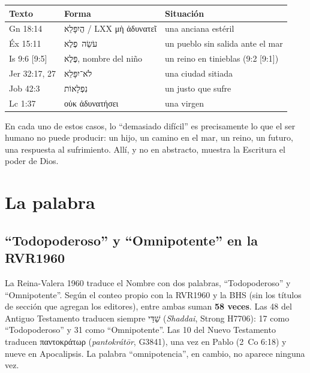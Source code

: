 \documentclass[11pt,letterpaper]{article}
\newcommand{\heb}[1]{\mbox{\foreignlanguage{hebrew}{#1}}}
\newcommand{\grc}[1]{\foreignlanguage{ancientgreek}{#1}}
\begin{document}
\begin{center}\small\renewcommand{\arraystretch}{1.25}
\begin{tabular}{@{}L{2.6cm}L{5.4cm}L{6.4cm}@{}}
\toprule
\textbf{Texto} & \textbf{Forma} & \textbf{Situación} \\ \midrule
Gn 18:14 & \heb{הֲיִפָּלֵא} / LXX \grc{μὴ ἀδυνατεῖ} & una anciana estéril \\
Éx 15:11 & \heb{עֹשֵׂה פֶלֶא} & un pueblo sin salida ante el mar \\
Is 9:6 [9:5] & \heb{פֶּלֶא}, nombre del niño & un reino en tinieblas (9:2 [9:1]) \\
Jer 32:17, 27 & \heb{לֹא־יִפָּלֵא} & una ciudad sitiada \\
Job 42:3 & \heb{נִפְלָאוֹת} & un justo que sufre \\
Lc 1:37 & \grc{οὐκ ἀδυνατήσει} & una virgen \\
\bottomrule
\end{tabular}\end{center}

En cada uno de estos casos, lo ``demasiado difícil'' es precisamente lo que el ser humano no puede producir: un hijo, un camino en el mar, un reino, un futuro, una respuesta al sufrimiento. Allí, y no en abstracto, muestra la Escritura el poder de Dios.

\section{La palabra}

\subsection{``Todopoderoso'' y ``Omnipotente'' en la RVR1960}\label{sec:shaddai}

La Reina-Valera 1960 traduce el Nombre con dos palabras, ``Todopoderoso'' y ``Omnipotente''. Según el conteo propio con la RVR1960 y la BHS (sin los títulos de sección que agregan los editores), entre ambas suman \textbf{58 veces}. Las 48 del Antiguo Testamento traducen siempre \heb{שַׁדַּי} (\emph{Shaddai}, Strong H7706): 17 como ``Todopoderoso'' y 31 como ``Omnipotente''. Las 10 del Nuevo Testamento traducen \grc{παντοκράτωρ} (\emph{pantokrátōr}, G3841), una vez en Pablo (2~Co 6:18) y nueve en Apocalipsis. La palabra ``omnipotencia'', en cambio, no aparece ninguna vez.
\end{document}
